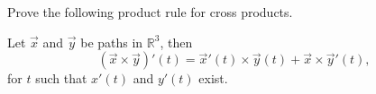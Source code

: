 \begin{problem}
Prove the following product rule for cross products.

Let $\vec{x}$ and $\vec{y}$ be paths in $\mathbb{R}^3$, then 
\[
(\vec{x}\times\vec{y})'(t) = \vec{x}'(t)\times\vec{y}(t) + \vec{x}\times\vec{y}'(t),
\]
for $t$ such that $x'(t)$ and $y'(t)$ exist.
\end{problem}